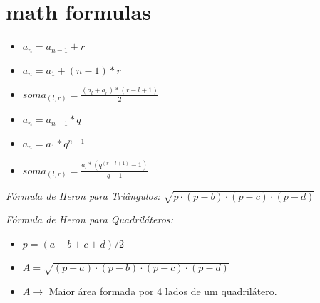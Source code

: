     
     
    \newpage
    \section{math formulas}
    \begin{itemize}
        \item $a_n = a_{n-1} + r$
        \item $a_n = a_1 + (n-1)*r$
        \item \begin{Large}
            $soma_{(l,r)} = \frac{(a_l + a_r) * (r-l+1)}{2}$
        \end{Large}
    \end{itemize}

    \begin{itemize}
    \item $a_n = a_{n-1}*q$
    \item $a_n = a_1*q^{n-1}$
    \item \begin{Large}
            $soma_{(l,r)} = \frac{a_l  * (q^{(r-l+1)}-1)}{q-1}$
        \end{Large}
    \end{itemize}
     
    \textit{Fórmula de Heron para Triângulos:} $\sqrt{p\cdot (p-b) \cdot (p-c) \cdot (p-d)}$
    
    \textit{Fórmula de Heron para Quadriláteros:}
    
    \begin{itemize}
        \item $p = (a+b+c+d)/2$
        \item $A = \sqrt{(p-a) \cdot (p-b) \cdot (p-c) \cdot (p-d)}$
        \item $A \rightarrow$ Maior área formada por 4 lados de um quadrilátero.
    \end{itemize}
    
